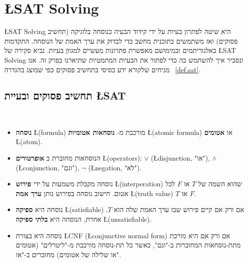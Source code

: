 
\section{\L{\normalsize SAT Solving}}\label{s.sat}

\L{SAT Solving}
היא שיטה לפתרון בעיות על ידי קידוד הבעיה כנוסחה בלוגיקה (תחשיב פסוקים) ואז משתמשים בתוכנית מחשב כדי לבדוק את ערך האמת של הנוסחה. התקדמות באלגוריתמים ובמימושם מאפשרת פתרונות מעשיים למגוון בעיות. נביא סקירה של 
\L{SAT Solving}
ונסביר איך להשתמש בה כדי לפתור את הבעיות המתמטיות שתיארנו בפרק זה. אנו מניחים שלקורא ידע בסיסי בתחשיב פסוקים כפי שמוצג בהגדרה%
~\ref{def.sat}.

\newpage

\subsection{תחשיב פסוקים ובעיית \L{SAT}}

\begin{definition}\label{def.sat}
\mbox{}\\
\vspace{-4ex}
\begin{itemize}
\item
\textbf{נוסחה}
\L{(formula)}
מורכבת מ-%
\textbf{נוסחאות אטומיות}
\L{(atomic formula)}
או
\textbf{אטומים}
\L{(atom)}.

\item 
הנוסחאות מחוברת ב%
\textbf{אופרטורים}
\L{(operators)}:
$\vee$ (\L{disjunction}, "או"),
$\wedge$ (\L{conjunction}, "וגם"),
$\neg$ (\L{negation}, "לא").

\item
נוסחה מקבלת משמעות על ידי 
\textbf{פירוש}
\L{(interperation)}
שהוא השמה של
$T$
או
$F$
לכל אטום. חישוב נוסחה בפירוש נותן 
\textbf{ערך אמת}
\L{(truth value)}
$T$
או
$F$. 

\item
נוסחה היא
\textbf{ספיקה}
\L{(satisfiable)}
אם ורק אם קיים פירוש שבו ערך האמת שלה הוא
$T$.
אחרת, הנוסחה היא
\textbf{בלתי ספיקה}
\L{(unsatisfiable)}.

\item
נוסחה היא בצורת
\L{CNF}
(\L{conjunctive normal form})
אם ורק אם היא מורכת מתת-נוסחאות המחוברות ב-"וגם", כאשר כל תת-נוסחה מורכבת מ-"ליטרלים" (אטומים או שלילה של אטומים) מחוברים ב-"או".
\end{itemize}
\end{definition}

